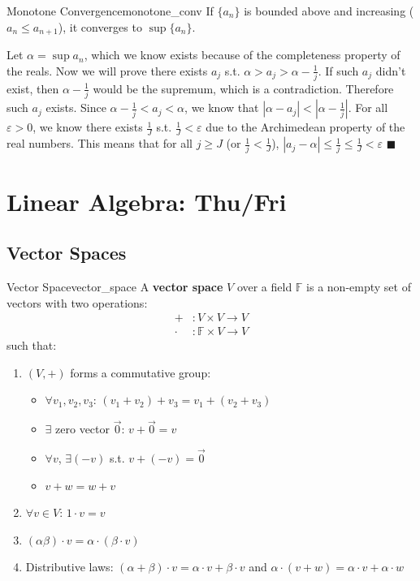 \documentclass[11pt, letterpaper, openany]{book}
\renewenvironment{proof}[1][\proofname]{%
  \tcolorbox[blanker, breakable, left=1em,
    before skip=1em, after skip=1em,
    borderline west={2pt}{0pt}{MagicTeal!50},
    colback=MagicCream,
    before upper={\textcolor{MagicTeal}{\sffamily\bfseries #1.}\space}
  ]%
}{%
  \hfill\textcolor{MagicTeal}{\ensuremath{\blacksquare}}\endtcolorbox%
}
\begin{document}
\begin{thm}{Monotone Convergence}{monotone_conv}
If $\{a_n\}$ is bounded above and increasing ($a_n\leq{a_{n+1}}$), it converges to $\sup \{a_n\}$.
\end{thm}
\begin{proof}
    Let $\alpha=\sup{a_n}$, which we know exists because of the completeness property of the reals. Now we will prove there exists $a_j$ s.t. $\alpha>a_j>\alpha-\frac{1}{j}$. If such $a_j$ didn't exist, then $\alpha-\frac{1}{j}$ would be the supremum, which is a contradiction. Therefore such $a_j$ exists. Since $\alpha-\frac{1}{j}<a_j<\alpha$, we know that $|\alpha-a_j|<|\alpha-\frac{1}{j}|$. For all $\varepsilon>0$, we know there exists $\frac{1}{J}$ s.t. $\frac{1}{J}<\varepsilon$ due to the Archimedean property of the real numbers. This means that for all $j\geq{J}$ (or $\frac{1}{j}<\frac{1}{J}$), $|a_j-\alpha|\leq\frac{1}{j}\leq\frac{1}{J}<\varepsilon$
\end{proof}

\section{Linear Algebra: Thu/Fri}

\subsection{Vector Spaces}

\begin{defn}{Vector Space}{vector_space}
A \textbf{vector space} $V$ over a field $\mathbb{F}$ is a non-empty set of vectors with two operations:
\begin{align*}
+&: V \times V \to V \\
\cdot&: \mathbb{F} \times V \to V
\end{align*}
such that:
\begin{enumerate}
    \item $(V, +)$ forms a commutative group:
    \begin{itemize}
        \item[(A1)] $\forall v_1, v_2, v_3$: $(v_1 + v_2) + v_3 = v_1 + (v_2 + v_3)$
        \item[(A2)] $\exists$ zero vector $\vec{0}$: $v + \vec{0} = v$
        \item[(A3)] $\forall v$, $\exists (-v)$ s.t. $v + (-v) = \vec{0}$
        \item[(A4)] $v + w = w + v$
    \end{itemize}
    \item $\forall v \in V$: $1 \cdot v = v$
    \item $(\alpha \beta) \cdot v = \alpha \cdot (\beta \cdot v)$
    \item Distributive laws: $(\alpha + \beta) \cdot v = \alpha \cdot v + \beta \cdot v$ and $\alpha \cdot (v + w) = \alpha \cdot v + \alpha \cdot w$
\end{enumerate}
\end{defn}
\end{document}
